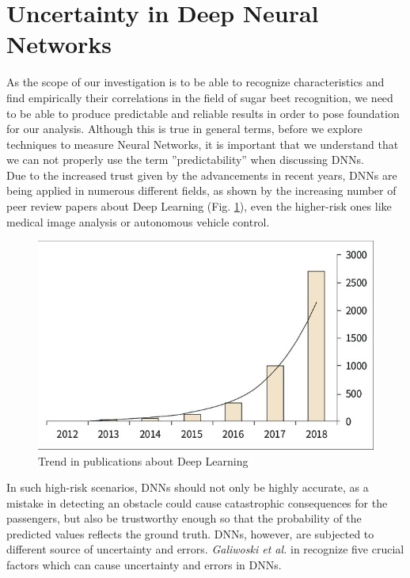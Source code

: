 \section{Uncertainty in Deep Neural Networks}
As the scope of our investigation is to be able to recognize characteristics and find empirically their correlations in the field of sugar beet recognition, we need to be able to produce predictable and reliable results in order to pose foundation for our analysis. Although this is true in general terms, before we explore techniques to measure Neural Networks, it is important that we understand that we can not properly use the term ''predictability'' when discussing DNNs. \\
Due to the increased trust given by the advancements in recent years, DNNs are being applied in numerous different fields, as shown by the increasing number of peer review papers about Deep Learning (Fig. \ref{fig:annual_trend}), even the higher-risk ones 
like medical image analysis or autonomous vehicle control. \cite{gawlikowski2021survey}
\begin{figure}[h]
    \centering
    \includegraphics{img/Annual-trend-in-the-number-of-papers-related-to-deep-learning-in-the-medical-field_W640.jpg}
    \caption[Trend in publications about Deep Learning]{Trend in publications about Deep Learning  \cite{Number_of_DL_papers}}
    \label{fig:annual_trend}
\end{figure}


In such high-risk scenarios, DNNs should not only be highly accurate, as a mistake in detecting an obstacle could cause catastrophic consequences for the passengers, but also be trustworthy enough so that the probability of the predicted values reflects the ground truth. DNNs, however, are subjected to different source of uncertainty and errors. \textit{Galiwoski et al.} in \cite{gawlikowski2021survey} recognize five crucial factors which can cause uncertainty and errors in DNNs.\\\hfill

